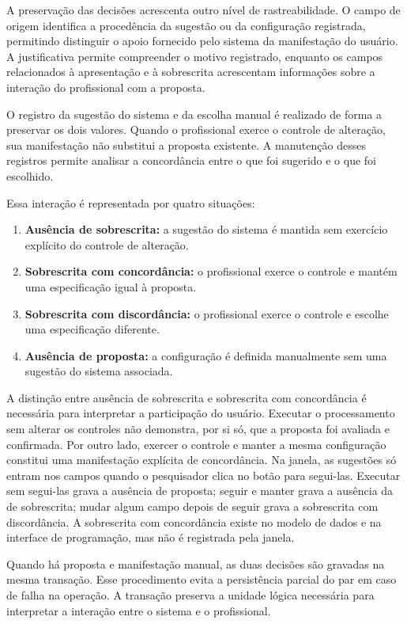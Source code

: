 A preservação das decisões acrescenta outro nível de rastreabilidade. O campo de origem identifica a procedência da sugestão ou da configuração registrada, permitindo distinguir o apoio fornecido pelo sistema da manifestação do usuário. A justificativa permite compreender o motivo registrado, enquanto os campos relacionados à apresentação e à sobrescrita acrescentam informações sobre a interação do profissional com a proposta.

O registro da sugestão do sistema e da escolha manual é realizado de forma a preservar os dois valores. Quando o profissional exerce o controle de alteração, sua manifestação não substitui a proposta existente. A manutenção desses registros permite analisar a concordância entre o que foi sugerido e o que foi escolhido.

Essa interação é representada por quatro situações:

\begin{enumerate}
    \item \textbf{Ausência de sobrescrita:} a sugestão do sistema é mantida sem exercício explícito do controle de alteração.
    \item \textbf{Sobrescrita com concordância:} o profissional exerce o controle e mantém uma especificação igual à proposta.
    \item \textbf{Sobrescrita com discordância:} o profissional exerce o controle e escolhe uma especificação diferente.
    \item \textbf{Ausência de proposta:} a configuração é definida manualmente sem uma sugestão do sistema associada.
\end{enumerate}

A distinção entre ausência de sobrescrita e sobrescrita com concordância é necessária para interpretar a participação do usuário. Executar o processamento sem alterar os controles não demonstra, por si só, que a proposta foi avaliada e confirmada. Por outro lado, exercer o controle e manter a mesma configuração constitui uma manifestação explícita de concordância. Na janela, as sugestões só entram nos campos quando o pesquisador clica no botão para segui-las. Executar sem segui-las grava a ausência de proposta; seguir e manter grava a ausência da de sobrescrita; mudar algum campo depois de seguir grava a sobrescrita com discordância. A sobrescrita com concordância existe no modelo de dados e na interface de programação, mas não é registrada pela janela.

Quando há proposta e manifestação manual, as duas decisões são gravadas na mesma transação. Esse procedimento evita a persistência parcial do par em caso de falha na operação. A transação preserva a unidade lógica necessária para interpretar a interação entre o sistema e o profissional.

